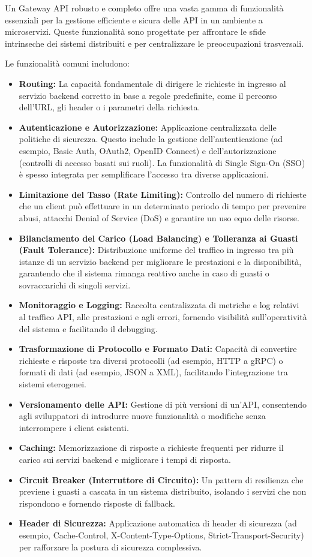 Un Gateway API robusto e completo offre una vasta gamma di funzionalità essenziali per la gestione efficiente e sicura delle API in un ambiente a microservizi. Queste funzionalità sono progettate per affrontare le sfide intrinseche dei sistemi distribuiti e per centralizzare le preoccupazioni trasversali.

Le funzionalità comuni includono:
\begin{itemize}
    \item \textbf{Routing:} La capacità fondamentale di dirigere le richieste in ingresso al servizio backend corretto in base a regole predefinite, come il percorso dell'URL, gli header o i parametri della richiesta.
    \item \textbf{Autenticazione e Autorizzazione:} Applicazione centralizzata delle politiche di sicurezza. Questo include la gestione dell'autenticazione (ad esempio, Basic Auth, OAuth2, OpenID Connect) e dell'autorizzazione (controlli di accesso basati sui ruoli). La funzionalità di Single Sign-On (SSO) è spesso integrata per semplificare l'accesso tra diverse applicazioni.
    \item \textbf{Limitazione del Tasso (Rate Limiting):} Controllo del numero di richieste che un client può effettuare in un determinato periodo di tempo per prevenire abusi, attacchi Denial of Service (DoS) e garantire un uso equo delle risorse.
    \item \textbf{Bilanciamento del Carico (Load Balancing) e Tolleranza ai Guasti (Fault Tolerance):} Distribuzione uniforme del traffico in ingresso tra più istanze di un servizio backend per migliorare le prestazioni e la disponibilità, garantendo che il sistema rimanga reattivo anche in caso di guasti o sovraccarichi di singoli servizi.
    \item \textbf{Monitoraggio e Logging:} Raccolta centralizzata di metriche e log relativi al traffico API, alle prestazioni e agli errori, fornendo visibilità sull'operatività del sistema e facilitando il debugging.
    \item \textbf{Trasformazione di Protocollo e Formato Dati:} Capacità di convertire richieste e risposte tra diversi protocolli (ad esempio, HTTP a gRPC) o formati di dati (ad esempio, JSON a XML), facilitando l'integrazione tra sistemi eterogenei.
    \item \textbf{Versionamento delle API:} Gestione di più versioni di un'API, consentendo agli sviluppatori di introdurre nuove funzionalità o modifiche senza interrompere i client esistenti.
    \item \textbf{Caching:} Memorizzazione di risposte a richieste frequenti per ridurre il carico sui servizi backend e migliorare i tempi di risposta.
    \item \textbf{Circuit Breaker (Interruttore di Circuito):} Un pattern di resilienza che previene i guasti a cascata in un sistema distribuito, isolando i servizi che non rispondono e fornendo risposte di fallback.
    \item \textbf{Header di Sicurezza:} Applicazione automatica di header di sicurezza (ad esempio, Cache-Control, X-Content-Type-Options, Strict-Transport-Security) per rafforzare la postura di sicurezza complessiva.
\end{itemize}

